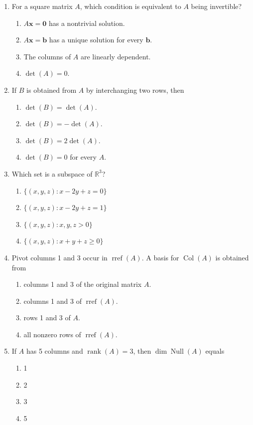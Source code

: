 \documentclass[11pt,a4paper]{article}
\begin{document}
\begingroup\small
\begin{enumerate}[label=\arabic*.,start=11]
  \item For a square matrix $A$, which condition is equivalent to $A$ being invertible?
    \begin{enumerate}
      \item $A\mathbf x=\mathbf 0$ has a nontrivial solution.
      \item $A\mathbf x=\mathbf b$ has a unique solution for every $\mathbf b$.
      \item The columns of $A$ are linearly dependent.
      \item $\det(A)=0$.
    \end{enumerate}

  \item If $B$ is obtained from $A$ by interchanging two rows, then
    \begin{enumerate}
      \item $\det(B)=\det(A)$.
      \item $\det(B)=-\det(A)$.
      \item $\det(B)=2\det(A)$.
      \item $\det(B)=0$ for every $A$.
    \end{enumerate}

  \item Which set is a subspace of $\mathbb R^{3}$?
    \begin{enumerate}
      \item $\{(x,y,z):x-2y+z=0\}$
      \item $\{(x,y,z):x-2y+z=1\}$
      \item $\{(x,y,z):x,y,z>0\}$
      \item $\{(x,y,z):x+y+z\geq 0\}$
    \end{enumerate}

  \item Pivot columns 1 and 3 occur in $\operatorname{rref}(A)$. A basis for
        $\operatorname{Col}(A)$ is obtained from
    \begin{enumerate}
      \item columns 1 and 3 of the original matrix $A$.
      \item columns 1 and 3 of $\operatorname{rref}(A)$.
      \item rows 1 and 3 of $A$.
      \item all nonzero rows of $\operatorname{rref}(A)$.
    \end{enumerate}

  \item If $A$ has 5 columns and $\operatorname{rank}(A)=3$, then
        $\dim\operatorname{Null}(A)$ equals
    \begin{enumerate}
      \item 1 \item 2 \item 3 \item 5
    \end{enumerate}
\end{enumerate}
\endgroup
\end{document}
